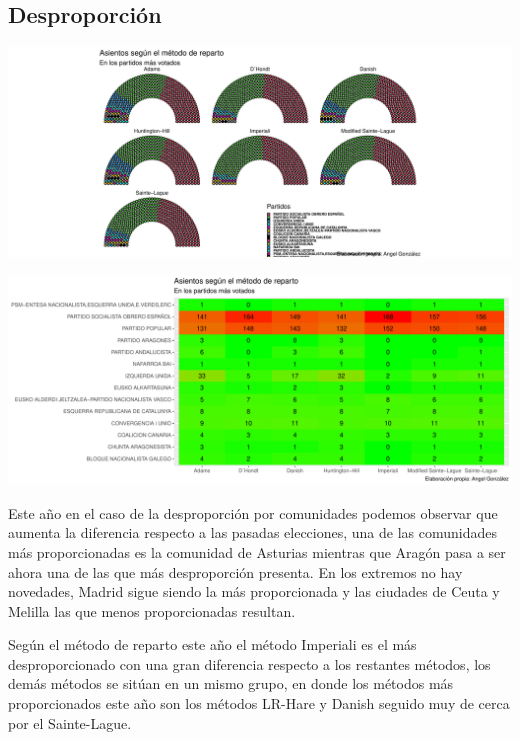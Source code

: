 \documentclass[12pt,a4paper,]{book}
\numberwithin{dummy}{section}
\theoremstyle{ocrenumbox}
\theoremstyle{blacknumex}
\theoremstyle{blacknumbox}
\theoremstyle{ocrenum}
\theoremstyle{ocrenum}
\begin{document}
\hypertarget{desproporciuxf3n-3}{%
\subsection{Desproporción}\label{desproporciuxf3n-3}}

\begin{center}\includegraphics[width=1\linewidth]{figurasR/unnamed-chunk-83-1} \end{center}

\begin{center}\includegraphics[width=1\linewidth]{figurasR/unnamed-chunk-83-2} \end{center}

Este año en el caso de la desproporción por comunidades podemos observar
que aumenta la diferencia respecto a las pasadas elecciones, una de las
comunidades más proporcionadas es la comunidad de Asturias mientras que
Aragón pasa a ser ahora una de las que más desproporción presenta. En
los extremos no hay novedades, Madrid sigue siendo la más proporcionada
y las ciudades de Ceuta y Melilla las que menos proporcionadas resultan.

Según el método de reparto este año el método Imperiali es el más
desproporcionado con una gran diferencia respecto a los restantes
métodos, los demás métodos se sitúan en un mismo grupo, en donde los
métodos más proporcionados este año son los métodos LR-Hare y Danish
seguido muy de cerca por el Sainte-Lague.
\end{document}
